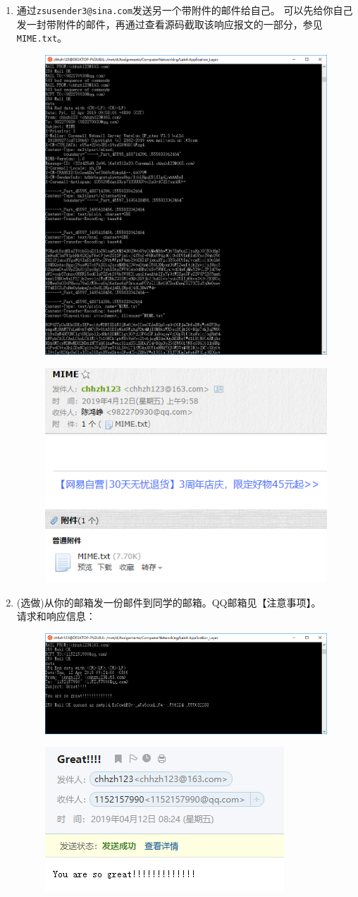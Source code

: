 \documentclass[logo,reportComp]{thesis}
\begin{document}
\begin{enumerate}
\item 通过\verb'zsusender3@sina.com'发送另一个带附件的邮件给自己。
可以先给你自己发一封带附件的邮件，再通过查看源码截取该响应报文的一部分，参见\verb'MIME.txt'。
\begin{figure}[H]
\centering
\includegraphics[width=0.8\linewidth]{fig/smtp-3.PNG}
\end{figure}
\begin{figure}[H]
\centering
\includegraphics[width=0.2\linewidth]{fig/smtp-31.PNG}
\end{figure}

\item (选做)从你的邮箱发一份邮件到同学的邮箱。QQ邮箱见【注意事项】。\\
请求和响应信息：
\begin{figure}[H]
\centering
\includegraphics[width=0.8\linewidth]{fig/smtp-4.PNG}
\end{figure}
\begin{figure}[H]
\centering
\includegraphics[width=0.2\linewidth]{fig/smtp-41.PNG}
\end{figure}

\end{enumerate}
\end{document}
